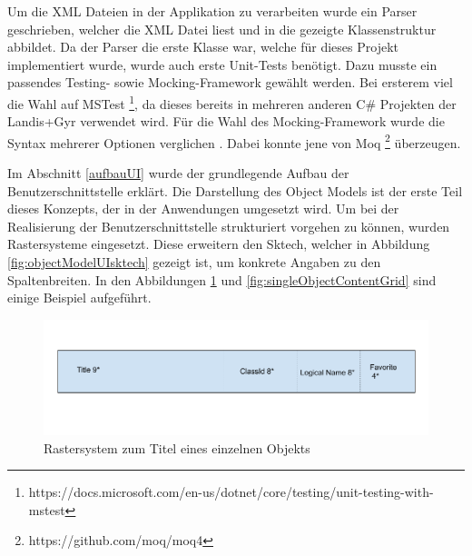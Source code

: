 Um die XML Dateien in der Applikation zu verarbeiten wurde ein Parser geschrieben, welcher die XML Datei liest und in die gezeigte Klassenstruktur abbildet.
Da der Parser die erste Klasse war, welche für dieses Projekt implementiert wurde, wurde auch erste Unit-Tests benötigt.
Dazu musste ein passendes Testing- sowie Mocking-Framework gewählt werden.
Bei ersterem viel die Wahl auf MSTest \footnote{https://docs.microsoft.com/en-us/dotnet/core/testing/unit-testing-with-mstest}, da dieses bereits in mehreren anderen C\# Projekten der Landis+Gyr verwendet wird.
Für die Wahl des Mocking-Framework wurde die Syntax mehrerer Optionen verglichen \parencite{clarke_2020}.
Dabei konnte jene von Moq \footnote{https://github.com/moq/moq4} überzeugen.

Im Abschnitt \ref{aufbauUI} wurde der grundlegende Aufbau der Benutzerschnittstelle erklärt.
Die Darstellung des Object Models ist der erste Teil dieses Konzepts, der in der Anwendungen umgesetzt wird.
Um bei der Realisierung der Benutzerschnittstelle strukturiert vorgehen zu können, wurden Rastersysteme eingesetzt.
Diese erweitern den Sktech, welcher in Abbildung \ref{fig:objectModelUIsktech} gezeigt ist, um konkrete Angaben zu den Spaltenbreiten.
In den Abbildungen \ref{fig:singleObjectTitleGrid} und \ref{fig:singleObjectContentGrid} sind einige Beispiel aufgeführt.

\begin{figure}
   \centering
   \includegraphics[width=1.0\textwidth]{gfx/Single Object Title Line Grid.png}
   \caption{
      Rastersystem zum Titel eines einzelnen Objekts
      }
      \label{fig:singleObjectTitleGrid}
\end{figure}

